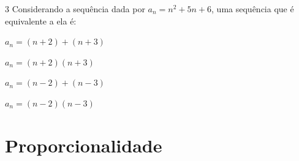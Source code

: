 

\num{3} Considerando a sequência dada por $a_{n} = n^{2} + 5n + 6$, uma
sequência que é equivalente a ela é:

\begin{multicols}{2}
\begin{escolha}[itemsep=0pt]
\item $a_{n} = (n + 2) + (n + 3)$
\item $a_{n} = (n + 2)(n + 3)$ 
\item $a_{n} = (n - 2) + (n - 3)$
\item $a_{n} = (n - 2)(n - 3)$
\end{escolha}
\end{multicols}




\chapter{Proporcionalidade}

